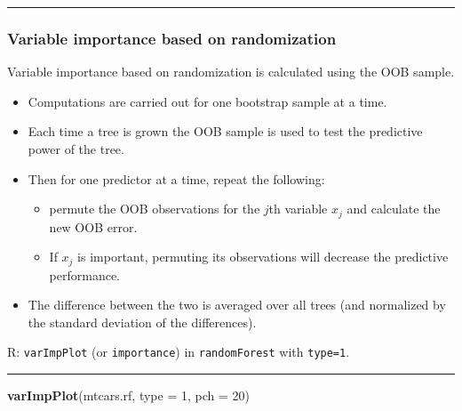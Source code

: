 \documentclass[]{article}
\newenvironment{Shaded}{\begin{snugshade}}{\end{snugshade}}
\newcommand{\DataTypeTok}[1]{\textcolor[rgb]{0.13,0.29,0.53}{#1}}
\newcommand{\DecValTok}[1]{\textcolor[rgb]{0.00,0.00,0.81}{#1}}
\newcommand{\KeywordTok}[1]{\textcolor[rgb]{0.13,0.29,0.53}{\textbf{#1}}}
\newcommand{\NormalTok}[1]{#1}
\providecommand{\tightlist}{%
  \setlength{\itemsep}{0pt}\setlength{\parskip}{0pt}}
\begin{document}
\begin{center}\rule{0.5\linewidth}{\linethickness}\end{center}

\hypertarget{variable-importance-based-on-randomization}{%
\subsubsection{Variable importance based on
randomization}\label{variable-importance-based-on-randomization}}

Variable importance based on randomization is calculated using the OOB
sample.

\begin{itemize}
\tightlist
\item
  Computations are carried out for one bootstrap sample at a time.
\item
  Each time a tree is grown the OOB sample is used to test the
  predictive power of the tree.
\item
  Then for one predictor at a time, repeat the following:

  \begin{itemize}
  \tightlist
  \item
    permute the OOB observations for the \(j\)th variable \(x_j\) and
    calculate the new OOB error.
  \item
    If \(x_j\) is important, permuting its observations will decrease
    the predictive performance.
  \end{itemize}
\item
  The difference between the two is averaged over all trees (and
  normalized by the standard deviation of the differences).
\end{itemize}

R: \texttt{varImpPlot} (or \texttt{importance}) in \texttt{randomForest}
with \texttt{type=1}.

\begin{center}\rule{0.5\linewidth}{\linethickness}\end{center}

\begin{Shaded}
\begin{Highlighting}[]
\KeywordTok{varImpPlot}\NormalTok{(mtcars.rf, }\DataTypeTok{type =} \DecValTok{1}\NormalTok{, }\DataTypeTok{pch =} \DecValTok{20}\NormalTok{)}
\end{Highlighting}
\end{Shaded}
\end{document}
